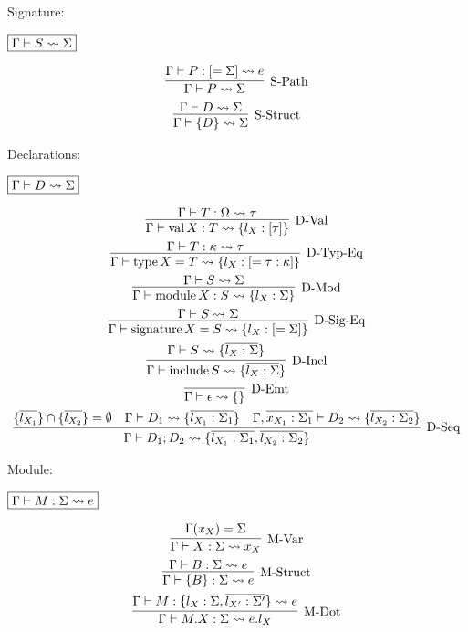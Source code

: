 Signature:

$\fbox{$\Gamma \vdash S \rightsquigarrow \Sigma$}$

\begin{gather*}
  \infer[\text{S-Path}]{\Gamma \vdash P \elaborate \Sigma}{
    \Gamma \vdash P: [= \Sigma] \elaborate e
  }
  \\
  \infer[\text{S-Struct}]{\Gamma \vdash \{D\} \elaborate \Sigma}{
    \Gamma \vdash D \elaborate \Sigma
  }
\end{gather*}

Declarations:

$\fbox{$\Gamma \vdash D \rightsquigarrow \Sigma$}$

\begin{gather*}
  \infer[\text{D-Val}]{\Gamma \vdash \symval X: T \elaborate \{l_X: [\tau]\}}{
    \Gamma \vdash T: \Omega \elaborate \tau
  }
  \\
  \infer[\text{D-Typ-Eq}]{\Gamma \vdash \symtype X = T \elaborate \{l_X: [= \tau: \kappa]\}}{
    \Gamma \vdash T: \kappa \elaborate \tau
  }
  \\
  \infer[\text{D-Mod}]{\Gamma \vdash \symmodule X: S \elaborate \{l_X: \Sigma\}}{
    \Gamma \vdash S \elaborate \Sigma
  }
  \\
  \infer[\text{D-Sig-Eq}]{\Gamma \vdash \symsignature X = S \elaborate \{l_X: [= \Sigma]\}}{
    \Gamma \vdash S \elaborate \Sigma
  }
  \\
  \infer[\text{D-Incl}]{\Gamma \vdash \syminclude S \elaborate \{\overline{l_X: \Sigma}\}}{
    \Gamma \vdash S \elaborate \{\overline{l_X: \Sigma}\}
  }
  \\
  \infer[\text{D-Emt}]{\Gamma \vdash \epsilon \elaborate \{\}}{}
  \\
  \infer[\text{D-Seq}]{\Gamma \vdash D_1; D_2 \elaborate \{\overline{l_{X_1}: \Sigma_1}, \overline{l_{X_2}: \Sigma_2}\}}{
    \{\overline{l_{X_1}}\} \cap \{\overline{l_{X_2}}\} = \emptyset
    &
    \Gamma \vdash D_1 \elaborate \{\overline{l_{X_1}: \Sigma_1}\}
    &
    \Gamma, \overline{x_{X_1}: \Sigma_1} \vdash D_2 \elaborate \{\overline{l_{X_2}: \Sigma_2}\}
  }
\end{gather*}

Module:

$\fbox{$\Gamma \vdash M: \Sigma \rightsquigarrow e$}$

\begin{gather*}
  \infer[\text{M-Var}]{\Gamma \vdash X: \Sigma \elaborate x_X}{
    \Gamma(x_X) = \Sigma
  }
  \\
  \infer[\text{M-Struct}]{\Gamma \vdash \{B\}: \Sigma \elaborate e}{
    \Gamma \vdash B: \Sigma \elaborate e
  }
  \\
  \infer[\text{M-Dot}]{\Gamma \vdash M.X: \Sigma \elaborate e.l_X}{
    \Gamma \vdash M: \{l_X: \Sigma, \overline{l_{X'}: \Sigma'}\} \elaborate e
  }
\end{gather*}

